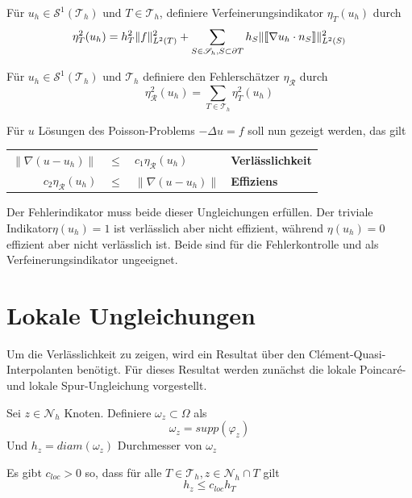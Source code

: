 \begin{definition}[Verfeinerungsindikator]
	Für $u_h \in \mathscr{S}^1(\mathscr{T}_h) \text{ und } T \in \mathscr{T}_h$, definiere Verfeinerungsindikator $\eta_T(u_h)$ durch
	\[
	\eta^2_T(u_h) = h^2_T\|f\|^2_{L^2(T)} + \sum_{S\in\mathscr{S}_h,S\subset\partial T} h_S\|\llbracket \nabla u_h \cdot n_S\rrbracket\|^2_{L^2(S)} \]
\end{definition}
\begin{definition}[Fehlerschätzer]
	Für $u_h \in \mathscr{S}^1(\mathscr{T}_h) \text{ und } \mathscr{T}_h$ definiere den Fehlerschätzer $\eta_\mathscr{R}$ durch
	\[
	\eta_\mathscr{R}^2(u_h)=\sum_{T\in\mathscr{T}_h} \eta^2_T(u_h)
	\]
\end{definition}
Für $u$ Lösungen des Poisson-Problems $-\Delta u = f$ soll nun gezeigt werden, das gilt \\
\begin{center}
	\begin{tabular}{r c l l}
		$\|\nabla(u-u_h)\|$ & $\leq$ & $c_1 \eta_\mathscr{R}(u_h)$ &\textbf{Verlässlichkeit} \\
		$c_2 \eta_\mathscr{R}(u_h)$ &$\leq$& $\|\nabla(u-u_h)\|$ &\textbf{Effiziens} \\
	\end{tabular}
\end{center}
Der Fehlerindikator muss beide dieser Ungleichungen erfüllen. Der triviale Indikator$\eta(u_h)=1$ ist verlässlich aber nicht effizient, während $\eta(u_h)=0$ effizient aber nicht verlässlich ist. Beide sind für die Fehlerkontrolle und als Verfeinerungsindikator ungeeignet.
\section{Lokale Ungleichungen}
Um die Verlässlichkeit zu zeigen, wird ein Resultat über den Clément-Quasi-Interpolanten benötigt. Für dieses Resultat werden zunächst die lokale Poincaré- und lokale Spur-Ungleichung vorgestellt.
\begin{definition}
	Sei $z \in \mathscr{N}_h$ Knoten. Definiere $\omega_z \subset \Omega$ als
	\[
	\omega_z = supp(\varphi_z)
	\]
	Und $h_z = diam(\omega_z)$ Durchmesser von $\omega_z$
\end{definition}
\begin{bemerkung}
	Es gibt $c_{loc} > 0$ so, dass für alle $T \in\mathscr{T}_h, z\in\mathscr{N}_h\cap T$ gilt
	\[
	h_z\leq c_{loc}h_T
	\]
\end{bemerkung}

